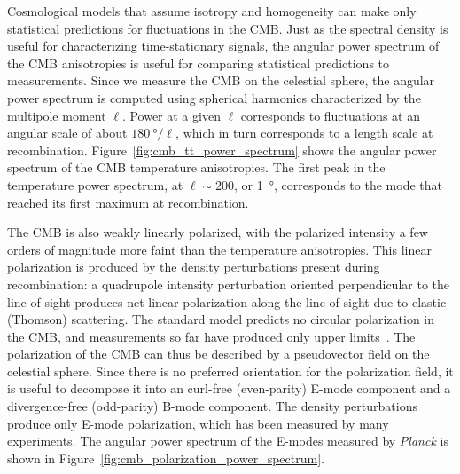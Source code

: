 Cosmological models that assume isotropy and homogeneity can make only statistical predictions for fluctuations in the CMB.
Just as the spectral density is useful for characterizing time-stationary signals, the angular power spectrum of the CMB anisotropies is useful for comparing statistical predictions to measurements.
Since we measure the CMB on the celestial sphere, the angular power spectrum is computed using spherical harmonics characterized by the multipole moment $\ell$.
Power at a given $\ell$ corresponds to fluctuations at an angular scale of about $\SI{180}{\degree} / \ell$, which in turn corresponds to a length scale at recombination.
Figure~\ref{fig:cmb_tt_power_spectrum} shows the angular power spectrum of the CMB temperature anisotropies.
The first peak in the temperature power spectrum, at $\ell \sim 200$, or \SI{1}{\degree}, corresponds to the mode that reached its first maximum at recombination.

The CMB is also weakly linearly polarized, with the polarized intensity a few orders of magnitude more faint than the temperature anisotropies.
This linear polarization is produced by the density perturbations present during recombination: a quadrupole intensity perturbation oriented perpendicular to the line of sight produces net linear polarization along the line of sight due to elastic (Thomson) scattering.
The standard model predicts no circular polarization in the CMB, and measurements so far have produced only upper limits~\autocite{Nagy2017ApJ}.
The polarization of the CMB can thus be described by a pseudovector field on the celestial sphere.
Since there is no preferred orientation for the polarization field, it is useful to decompose it into an curl-free (even-parity) E-mode component and a divergence-free (odd-parity) B-mode component.
The density perturbations produce only E-mode polarization, which has been measured by many experiments.
The angular power spectrum of the E-modes measured by \textit{Planck} is shown in Figure~\ref{fig:cmb_polarization_power_spectrum}.

